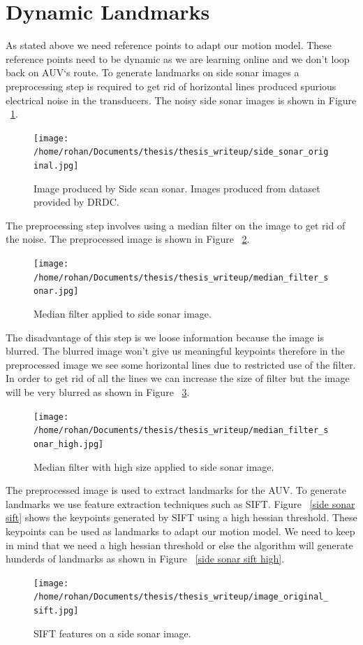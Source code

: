 \documentclass[12pt,draft]{dalcsthesis}
\begin{document}
\section{Dynamic Landmarks}
\label{ch-: dynamic landmarks}

As stated above we need reference points to adapt our motion model. These reference points need to be dynamic as we are learning online and we don't loop back on AUV`s route. To generate landmarks on side sonar images a preprocessing step is required to get rid of horizontal lines produced spurious electrical noise in the transducers. The noisy side sonar images is shown in Figure ~\ref{fig- side sonar image original}.

\begin{figure}
  \centering
     {\texttt{[image: /home/rohan/Documents/thesis/thesis\_writeup/side\_sonar\_original.jpg]}}
  \caption{\label{fig- side sonar image original} Image produced by Side scan sonar. Images produced from dataset provided by DRDC.}
\end{figure}


The preprocessing step involves using a median filter on the image to get rid of the noise. The preprocessed image is shown in Figure ~\ref{fig- side sonar median}.
\begin{figure}
  \centering
     {\texttt{[image: /home/rohan/Documents/thesis/thesis\_writeup/median\_filter\_sonar.jpg]}}
  \caption{\label{fig- side sonar median} Median filter applied to side sonar image.}
\end{figure}

The disadvantage of this step is we loose information because the image is blurred. The blurred image won't give us meaningful keypoints therefore in the preprocessed image we see some horizontal lines due to restricted use of the filter. In order to get rid of all the lines we can increase the size of filter but the image will be very blurred as shown in Figure ~\ref{fig- side sonar median high}.
\begin{figure}
  \centering
     {\texttt{[image: /home/rohan/Documents/thesis/thesis\_writeup/median\_filter\_sonar\_high.jpg]}}
  \caption{\label{fig- side sonar median high} Median filter with high size applied to side sonar image.}
\end{figure}

The preprocessed image is used to extract landmarks for the AUV. To generate landmarks we use feature extraction techniques such as SIFT. Figure ~\ref{side sonar sift} shows the keypoints generated by SIFT using a high hessian threshold. These keypoints can be used as landmarks to adapt our motion model. We need to keep in mind that we need a high hessian threshold or else the algorithm will generate hunderds of landmarks as shown in Figure ~\ref{side sonar sift high}.
\begin{figure}
  \centering
     {\texttt{[image: /home/rohan/Documents/thesis/thesis\_writeup/image\_original\_sift.jpg]}}
  \caption{\label{fig- side sonar sift} SIFT features on a side sonar image.}
\end{figure}
\end{document}

